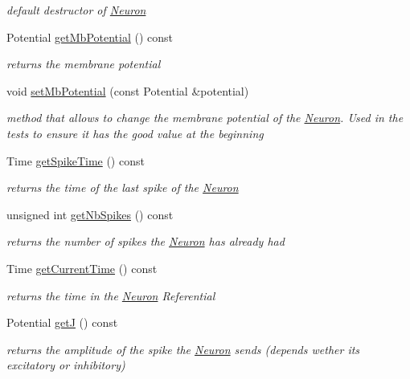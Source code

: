 \begin{DoxyCompactItemize}
\begin{DoxyCompactList}\small\item\em default destructor of \hyperlink{classNeuron}{Neuron} \end{DoxyCompactList}\item 
Potential \hyperlink{classNeuron_a7b0a9570b046fbb67e091d46104c6edc}{get\+Mb\+Potential} () const 
\begin{DoxyCompactList}\small\item\em returns the membrane potential \end{DoxyCompactList}\item 
void \hyperlink{classNeuron_a795cfa1c74ddae56cca00cd3aa8790f8}{set\+Mb\+Potential} (const Potential \&potential)
\begin{DoxyCompactList}\small\item\em method that allows to change the membrane potential of the \hyperlink{classNeuron}{Neuron}. Used in the tests to ensure it has the good value at the beginning \end{DoxyCompactList}\item 
Time \hyperlink{classNeuron_a69a6370d2c8aa4105d30f543bf8dac00}{get\+Spike\+Time} () const 
\begin{DoxyCompactList}\small\item\em returns the time of the last spike of the \hyperlink{classNeuron}{Neuron} \end{DoxyCompactList}\item 
unsigned int \hyperlink{classNeuron_a080fe09731808e0b8210713a7e3fdc3a}{get\+Nb\+Spikes} () const 
\begin{DoxyCompactList}\small\item\em returns the number of spikes the \hyperlink{classNeuron}{Neuron} has already had \end{DoxyCompactList}\item 
Time \hyperlink{classNeuron_a79e23734d7cd15d93db681f06df18293}{get\+Current\+Time} () const 
\begin{DoxyCompactList}\small\item\em returns the time in the \hyperlink{classNeuron}{Neuron} Referential \end{DoxyCompactList}\item 
Potential \hyperlink{classNeuron_a4f92588d104d30c752492e72ee210df8}{getJ} () const 
\begin{DoxyCompactList}\small\item\em returns the amplitude of the spike the \hyperlink{classNeuron}{Neuron} sends (depends wether it\textquotesingle{}s excitatory or inhibitory) \end{DoxyCompactList}\item 

\end{DoxyCompactItemize}

